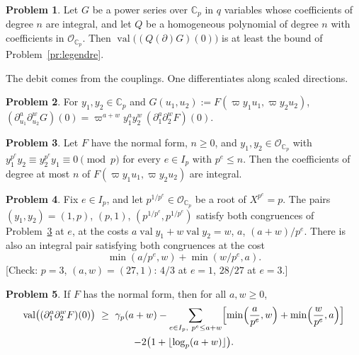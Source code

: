 \documentclass[reqno]{amsart}
\theoremstyle{plain}
\theoremstyle{definition}
\newtheorem{problem}{Problem}[section]
\theoremstyle{remark}
\newcommand{\C}{\mathbb{C}}
\newcommand{\Op}{\mathcal{O}_{\C_p}}
\newcommand{\val}{\operatorname{val}}
\begin{document}
\begin{problem}\label{pr:homogeneous}
Let \(G\) be a power series over \(\C_p\) in \(q\) variables whose coefficients of degree \(n\) are integral, and let \(Q\) be a homogeneous polynomial of degree \(n\) with coefficients in \(\Op\).  Then \(\val\bigl((Q(\partial)G)(0)\bigr)\) is at least the bound of Problem~\ref{pr:legendre}.
\end{problem}

The debit comes from the couplings.  One differentiates along scaled directions.

\begin{problem}\label{pr:rescale}
For \(y_1, y_2 \in \C_p\) and \(G(u_1, u_2) := F(\varpi y_1 u_1, \varpi y_2 u_2)\),
\(
  (\partial_{u_1}^a \partial_{u_2}^w G)(0) = \varpi^{a+w} y_1^a y_2^w\, (\partial_1^a \partial_2^w F)(0) .
\)
\end{problem}

\begin{problem}\label{pr:integral}
Let \(F\) have the normal form, \(n \ge 0\), and \(y_1, y_2 \in \Op\) with \(y_1^{p^e} y_2 \equiv y_2^{p^e} y_1 \equiv 0 \pmod p\) for every \(e \in I_p\) with \(p^e \le n\).  Then the coefficients of degree at most \(n\) of \(F(\varpi y_1 u_1, \varpi y_2 u_2)\) are integral.
\end{problem}

\begin{problem}\label{pr:scalings}
Fix \(e \in I_p\), and let \(p^{1/p^e} \in \Op\) be a root of \(X^{p^e} = p\).  The pairs \((y_1, y_2) = (1, p)\), \((p, 1)\), \((p^{1/p^e}, p^{1/p^e})\) satisfy both congruences of Problem~\ref{pr:integral} at \(e\), at the costs \(a \val y_1 + w \val y_2 = w\), \(a\), \((a + w)/p^e\).  There is also an integral pair satisfying both congruences at the cost
\[
  \min(a/p^e, w) + \min(w/p^e, a) .
\]
[Check: \(p = 3\), \((a, w) = (27, 1)\): \(4/3\) at \(e = 1\), \(28/27\) at \(e = 3\).]
\end{problem}

\begin{problem}\label{pr:model-bound}
If \(F\) has the normal form, then for all \(a, w \ge 0\),
\begin{multline*}
  \val\bigl((\partial_1^a \partial_2^w F)(0)\bigr) \ \ge\ \gamma_p (a + w) - \sum_{e \in I_p,\ p^e \le a + w} \Bigl[\min\Bigl(\frac{a}{p^e}, w\Bigr) + \min\Bigl(\frac{w}{p^e}, a\Bigr)\Bigr] \\ - 2\bigl(1 + \lfloor \log_p(a + w) \rfloor\bigr).
\end{multline*}
\end{problem}
\end{document}
